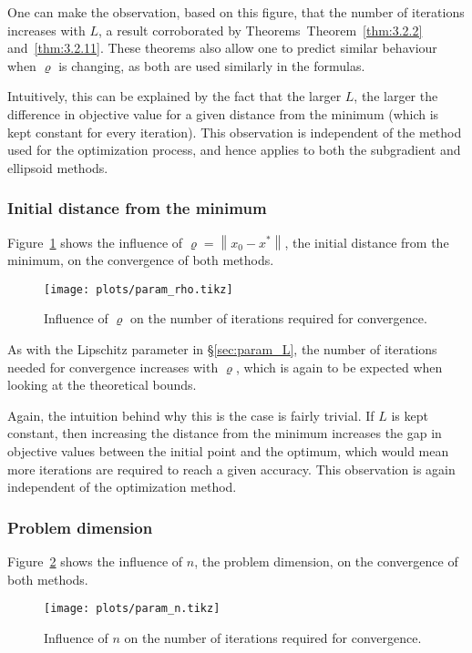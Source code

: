 \documentclass[final]{aomart}
\newcommand{\xopt}{x^*}
\newtheorem[{}\it]{thm}{Theorem}[section]
\theoremstyle{definition}
\newtheorem*[{}\it]{notation}{Notation}
\numberwithin{equation}{section}
\newcommand{\thmref}[1]{Theorem~\ref{#1}}
\newcommand{\secref}[1]{\S\ref{#1}}
\renewcommand{\rho}{\varrho}
\newcommand{\enVert}[1]{\left\lVert#1\right\rVert}
\let\norm=\enVert
\begin{document}
One can make the observation, based on this figure, that the number of iterations increases with \(L\), a result corroborated by Theorems~\thmref{thm:3.2.2} and~\ref{thm:3.2.11}.
These theorems also allow one to predict similar behaviour when \(\rho\) is changing, as both are used similarly in the formulas.

Intuitively, this can be explained by the fact that the larger \(L\), the larger the difference in objective value for a given distance from the minimum (which is kept constant for every iteration).
This observation is independent of the method used for the optimization process, and hence applies to both the subgradient and ellipsoid methods.

\subsubsection{Initial distance from the minimum}
Figure~\ref{fig:param_rho} shows the influence of \(\rho = \norm{x_0 - \xopt}\), the initial distance from the minimum, on the convergence of both methods.
\begin{figure}[H]
	\centering
	\texttt{[image: plots/param\_rho.tikz]}
	\caption{Influence of \(\rho\) on the number of iterations required for convergence.}
	\label{fig:param_rho}
\end{figure}

As with the Lipschitz parameter in \secref{sec:param_L}, the number of iterations needed for convergence increases with \(\rho\), which is again to be expected when looking at the theoretical bounds.

Again, the intuition behind why this is the case is fairly trivial.
If \(L\) is kept constant, then increasing the distance from the minimum increases the gap in objective values between the initial point and the optimum, which would mean more iterations are required to reach a given accuracy.
This observation is again independent of the optimization method.

\subsubsection{Problem dimension}
Figure~\ref{fig:param_n} shows the influence of \(n\), the problem dimension, on the convergence of both methods.
\begin{figure}[H]
	\centering
	\texttt{[image: plots/param\_n.tikz]}
	\caption{Influence of \(n\) on the number of iterations required for convergence.}
	\label{fig:param_n}
\end{figure}
\end{document}
